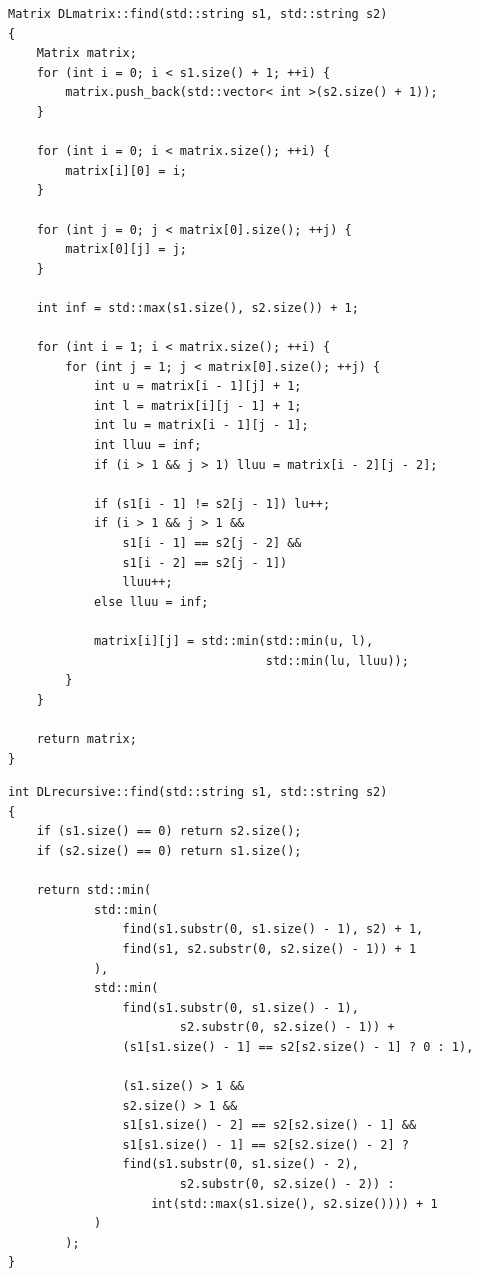 \documentclass[a4paper,12pt]{article}
\begin{document}
\begin{lstlisting}[caption=Расстояние Дамерау-Левенштейна матричный метод]
Matrix DLmatrix::find(std::string s1, std::string s2)
{
    Matrix matrix;
    for (int i = 0; i < s1.size() + 1; ++i) {
        matrix.push_back(std::vector< int >(s2.size() + 1));
    }

    for (int i = 0; i < matrix.size(); ++i) {
        matrix[i][0] = i;
    }

    for (int j = 0; j < matrix[0].size(); ++j) {
        matrix[0][j] = j;
    }

    int inf = std::max(s1.size(), s2.size()) + 1;

    for (int i = 1; i < matrix.size(); ++i) {
        for (int j = 1; j < matrix[0].size(); ++j) {
            int u = matrix[i - 1][j] + 1;
            int l = matrix[i][j - 1] + 1;
            int lu = matrix[i - 1][j - 1];
            int lluu = inf;
            if (i > 1 && j > 1) lluu = matrix[i - 2][j - 2];

            if (s1[i - 1] != s2[j - 1]) lu++;
            if (i > 1 && j > 1 &&
                s1[i - 1] == s2[j - 2] &&
                s1[i - 2] == s2[j - 1])
                lluu++;
            else lluu = inf;

            matrix[i][j] = std::min(std::min(u, l),
                                    std::min(lu, lluu));
        }
    }

    return matrix;
}
\end{lstlisting}

\begin{lstlisting}[caption=Расстояние Дамерау-Левенштейна рекурсивный метод]
int DLrecursive::find(std::string s1, std::string s2)
{
    if (s1.size() == 0) return s2.size();
    if (s2.size() == 0) return s1.size();

    return std::min(
            std::min(
                find(s1.substr(0, s1.size() - 1), s2) + 1,
                find(s1, s2.substr(0, s2.size() - 1)) + 1
            ),
            std::min(
                find(s1.substr(0, s1.size() - 1),
                        s2.substr(0, s2.size() - 1)) +
                (s1[s1.size() - 1] == s2[s2.size() - 1] ? 0 : 1),

                (s1.size() > 1 &&
                s2.size() > 1 &&
                s1[s1.size() - 2] == s2[s2.size() - 1] &&
                s1[s1.size() - 1] == s2[s2.size() - 2] ?
                find(s1.substr(0, s1.size() - 2),
                        s2.substr(0, s2.size() - 2)) :
                    int(std::max(s1.size(), s2.size()))) + 1
            )
        );
}

\end{lstlisting}
\end{document}
